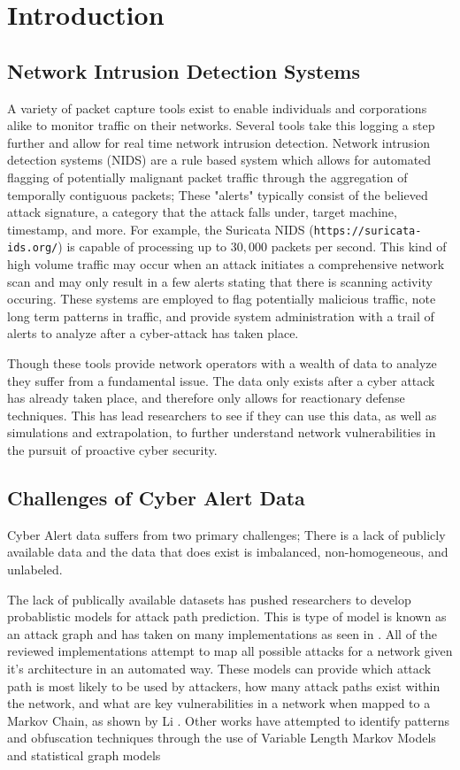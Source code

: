 \chapter{Introduction}

\section{Network Intrusion Detection Systems}
A variety of packet capture tools exist to enable individuals and corporations alike to monitor traffic on their networks. Several tools take this logging a step further and allow for real time network intrusion detection. Network intrusion detection systems (NIDS) are a rule based system which allows for automated flagging of potentially malignant packet traffic through the aggregation of temporally contiguous packets;  These "alerts" typically consist of the believed attack signature, a category that the attack falls under, target machine, timestamp, and more.   For example, the Suricata NIDS (\texttt{https://suricata-ids.org/}) is capable of processing up to $30,000$ packets per second. This kind of high volume traffic may occur when an attack initiates a comprehensive network scan and may only result in a few alerts stating that there is scanning activity occuring. These systems are employed to flag potentially malicious traffic, note long term patterns in traffic, and provide system administration with a trail of alerts to analyze after a cyber-attack has taken place. 

Though these tools provide network operators with a wealth of data to analyze they suffer from a fundamental issue. The data only exists after a cyber attack has already taken place, and therefore only allows for reactionary defense techniques. This has lead researchers to see if they can use this data, as well as simulations and extrapolation, to further understand network vulnerabilities in the pursuit of proactive cyber security. 

\section{Challenges of Cyber Alert Data}
Cyber Alert data suffers from two primary challenges; There is a lack of publicly available data and the data that does exist is imbalanced, non-homogeneous, and unlabeled. 

The lack of publically available datasets has pushed researchers to develop probablistic models for attack path prediction. This is type of model is known as an attack graph and has taken on many implementations as seen in \cite{Qin2004, Wang2006, Noel2009}. All of the reviewed implementations attempt to map all possible attacks for a network given it's architecture in an automated way. These models can provide which attack path is most likely to be used by attackers, how many attack paths exist within the network, and what are key vulnerabilities in a network when mapped to a Markov Chain, as shown by Li \cite{Li2017}. Other works have attempted to identify patterns and obfuscation techniques through the use of Variable Length Markov Models \cite{Fava2008} and statistical graph models \cite{Du2014}


